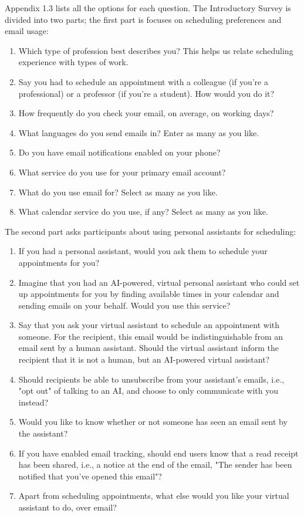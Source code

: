 \documentclass{article}
\begin{document}
Appendix 1.3 lists all the options for each question. The Introductory Survey is divided into two parts; the first part is focuses on scheduling preferences and email usage:

\begin{enumerate}
	\item Which type of profession best describes you? This helps us relate scheduling experience with types of work.
	\item Say you had to schedule an appointment with a colleague (if you're a professional) or a professor (if you're a student). How would you do it?
	\item How frequently do you check your email, on average, on working days?
	\item What languages do you send emails in? Enter as many as you like.
	\item Do you have email notifications enabled on your phone?
	\item What service do you use for your primary email account?
	\item What do you use email for? Select as many as you like.
	\item What calendar service do you use, if any? Select as many as you like.
\end{enumerate}

The second part asks participants about using personal assistants for scheduling:

\begin{enumerate}[resume]
	\item If you had a personal assistant, would you ask them to schedule your appointments for you?
	\item Imagine that you had an AI-powered, virtual personal assistant who could set up appointments for you by finding available times in your calendar and sending emails on your behalf. Would you use this service?
	\item Say that you ask your virtual assistant to schedule an appointment with someone. For the recipient, this email would be indistinguishable from an email sent by a human assistant. Should the virtual assistant inform the recipient that it is not a human, but an AI-powered virtual assistant?
	\item Should recipients be able to unsubscribe from your assistant's emails, i.e., "opt out" of talking to an AI, and choose to only communicate with you instead?
	\item Would you like to know whether or not someone has seen an email sent by the assistant?
	\item If you have enabled email tracking, should end users know that a read receipt has been shared, i.e., a notice at the end of the email, "The sender has been notified that you've opened this email"?
	\item Apart from scheduling appointments, what else would you like your virtual assistant to do, over email?
\end{enumerate}
\end{document}
